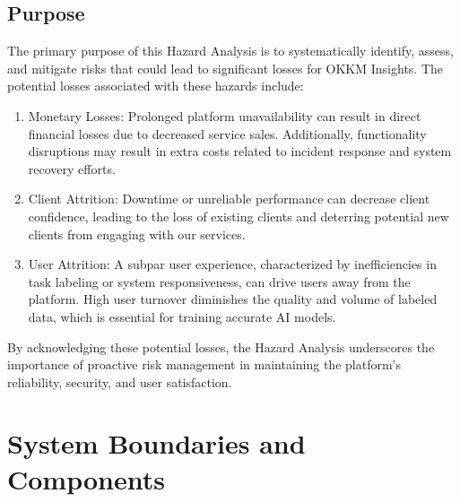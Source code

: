\documentclass{article}
\begin{document}
\subsection{Purpose}
The primary purpose of this Hazard Analysis is to systematically identify, assess, and mitigate risks that could lead to significant losses for OKKM Insights. The potential losses associated with these hazards include:
\begin{enumerate}
    \item Monetary Losses: Prolonged platform unavailability can result in direct financial losses due to decreased service sales. Additionally, functionality disruptions may result in extra costs related to incident response and system recovery efforts.
    \item Client Attrition: Downtime or unreliable performance can decrease client confidence, leading to the loss of existing clients and deterring potential new clients from engaging with our services.
    \item User Attrition: A subpar user experience, characterized by inefficiencies in task labeling or system responsiveness, can drive users away from the platform. High user turnover diminishes the quality and volume of labeled data, which is essential for training accurate AI models.
\end{enumerate}
By acknowledging these potential losses, the Hazard Analysis underscores the importance of proactive risk management in maintaining the platform's reliability, security, and user satisfaction.

\section{System Boundaries and Components}
\end{document}
